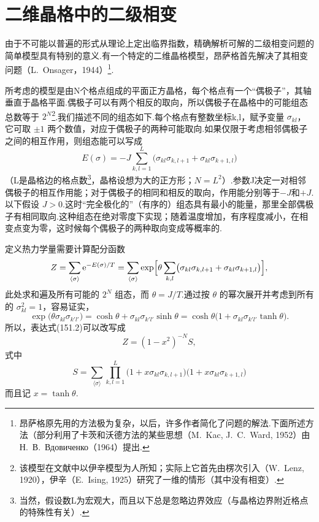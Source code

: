 \section{二维晶格中的二级相变}

由于不可能以普遍的形式从理论上定出临界指数，精确解析可解的二级相变问题的简单模型具有特别的意义.有一个特定的二维晶格模型，昂萨格首先解决了其相变问题（L.~Onsager，1944）\footnote{昂萨格原先用的方法极为复杂，以后，许多作者简化了问题的解法.下面所述方法（部分利用了卡茨和沃德方法的某些思想（M.~Kac, J.~C.~Ward, 1952）由 Н.~В.~Вдовиченко（1964）提出.}.

所考虑的模型是由N个格点组成的平面正方晶格，每个格点有一个“偶极子”，其轴垂直于晶格平面.偶极子可以有两个相反的取向，所以偶极子在晶格中的可能组态总数等于 $2^N$\footnote{该模型在文献中以伊辛模型为人所知；实际上它首先由楞次引入（W.~Lenz, 1920），伊辛（E.~Ising, 1925）研究了一维的情形（其中没有相变）.}.我们描述不同的组态如下.每个格点有整数坐标k,l，赋予变量 $\sigma_{kl}$，它可取 $\pm1$ 两个数值，对应于偶极子的两种可能取向.如果仅限于考虑相邻偶极子之间的相互作用，则组态能可以写成
\begin{equation}
  E(\sigma)=-J\sum_{k,l=1}^{L}
  \bigl(\sigma_{kl}\sigma_{k,l+1}+\sigma_{kl}\sigma_{k+1,l}\bigr)
\end{equation}
（L是晶格边的格点数\footnote{当然，假设数L为宏观大，而且以下总是忽略边界效应（与晶格边界附近格点的特殊性有关）.}，晶格设想为大的正方形；$N=L^2$）.参数J决定一对相邻偶极子的相互作用能；对于偶极子的相同和相反的取向，作用能分别等于$-J$和$+J$.以下假设 $J>0$.这时“完全极化的”（有序的）组态具有最小的能量，那里全部偶极子有相同取向.这种组态在绝对零度下实现；随着温度增加，有序程度减小，在相变点变为零，这时候每个偶极子的两种取向变成等概率的.

定义热力学量需要计算配分函数
\begin{equation}
  Z=\sum_{\langle\sigma\rangle}\mathrm{e}^{-E(\sigma)/T}
  =\sum_{\langle\sigma\rangle}\exp\Bigl[\theta\sum_{k,l}
  \bigl(\sigma_{kl}\sigma_{k,l+1}+\sigma_{kl}\sigma_{k+1,l}\bigr)\Bigr],
\end{equation}
此处求和遍及所有可能的 $2^N$ 组态，而 $\theta=J/T$.通过按 $\theta$ 的幂次展开并考虑到所有的 $\sigma_{kl}^2=1$，容易证实，
\begin{equation*}
  \exp\bigl(\theta\sigma_{kl}\sigma_{k'l'}\bigr)
  =\cosh\theta+\sigma_{kl}\sigma_{k'l'}\sinh\theta
  =\cosh\theta\bigl(1+\sigma_{kl}\sigma_{k'l'}\tanh\theta\bigr).
\end{equation*}
所以，表达式(151.2)可以改写成
\begin{equation}
  Z=(1-x^2)^{-N}S,
\end{equation}
式中
\begin{equation}
  S=\sum_{\langle\sigma\rangle}\prod_{k,l=1}^{L}
  \bigl(1+x\sigma_{kl}\sigma_{k,l+1}\bigr)
  \bigl(1+x\sigma_{kl}\sigma_{k+1,l}\bigr)
\end{equation}
而且记 $x=\tanh\theta$.

